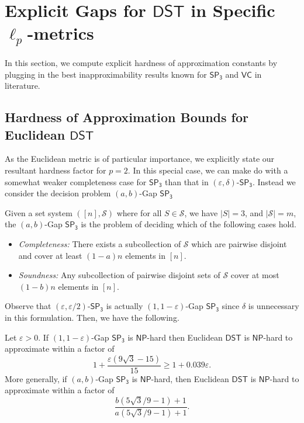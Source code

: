\documentclass{theoretics}
\newcommand{\1}{\textbf{1}}
\newcommand{\setpT}{$\mathsf{SP_3}$\xspace}
\newcommand{\dst}{$\mathsf{DST}$\xspace}
\newcommand{\np}{$\mathsf{NP}$\xspace}
\newcommand{\vcov}{$\mathsf{VC}$\xspace}
\begin{document}
\printbibliography
\newpage

\appendix
\section{Explicit Gaps for \texorpdfstring{\dst}{DST} in Specific \texorpdfstring{$\ell_p$}{lp}-metrics}\label{sec:explicit}
In this section, we compute explicit hardness of approximation constants by plugging in the best inapproximability results known for \setpT and \vcov in literature.
\subsection{Hardness of Approximation Bounds for Euclidean \texorpdfstring{\dst}{DST}}
As the Euclidean metric is of particular importance, we explicitly state our resultant hardness factor for $p = 2$. In this special case, we can make do with a somewhat weaker completeness case for \setpT than that in $(\varepsilon, \delta)$-\setpT. Instead we consider the decision problem $(a,b)$-Gap \setpT 
\begin{definition}[$(a,b)$-Gap \setpT]
Given a set system $([n], \mathcal{S})$ where  for all $S \in \mathcal{S}$, we have $|S| = 3$, and $|\mathcal{S}| = m$, the  $(a,b)$-Gap \setpT is  the problem of deciding which of the following cases hold.
\begin{itemize}
    \item \textit{Completeness:} There exists a subcollection of $\mathcal{S}$ which are pairwise disjoint and cover at least $(1-a)n$ elements in $[n]$.
    \item \textit{Soundness:} Any subcollection of pairwise disjoint sets of $\mathcal{S}$ cover at most $(1-b)n$ elements in $[n]$.
\end{itemize}
\end{definition}
Observe that $(\varepsilon, \varepsilon/2)$-\setpT is actually $(1, 1-\varepsilon)$-Gap \setpT since $\delta$ is unnecessary in this formulation. Then, we have the following.
\begin{corollary} \label{cor: Euc hardness}
Let $\varepsilon>0$. If  $(1, 1-\varepsilon)$-Gap \setpT is \np-hard then 
Euclidean \dst is \np-hard to approximate within a factor of
\[
1 + \frac{\varepsilon(9\sqrt{3} -15)}{15} \geq 1 + 0.039\varepsilon.
\]
More generally, if $(a, b)$-Gap \setpT is \np-hard, then Euclidean \dst is \np-hard to approximate within a factor of
\[
\frac{b(5\sqrt{3}/9 - 1) + 1}{a(5\sqrt{3}/9 - 1) + 1}.
\]
\end{corollary}
\end{document}
